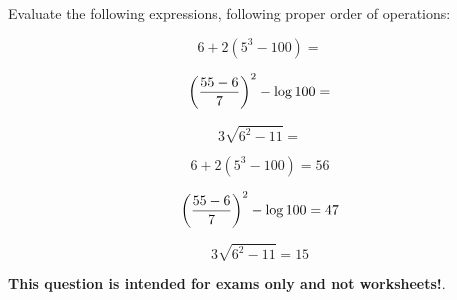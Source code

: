 

Evaluate the following expressions, following proper order of operations:

$$6 + 2(5^3 - 100) = $$

$$\left({{55 - 6} \over 7}\right)^2 - \log 100 = $$

$$3 \sqrt{6^2 - 11} = $$







$$6 + 2(5^3 - 100) = 56$$

$$\left({{55 - 6} \over 7}\right)^2 - \log 100 = 47$$

$$3 \sqrt{6^2 - 11} = 15$$







{\bf This question is intended for exams only and not worksheets!}.





